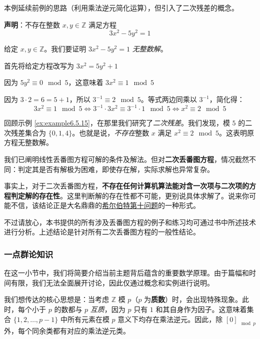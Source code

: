 \begin{example}
    本例延续前例的思路（利用乘法逆元简化运算），但引入了二次残差的概念。

    \textbf{声明}：不存在整数 $x, y \in \mathbb{Z}$ 满足方程
    \[3x^2-5y^2=1\]

    给定 $x, y \in \mathbb{Z}$。我们要证明 $3x^2-5y^2=1$ \emph{无整数解}。

    首先将给定方程改写为 $3x^2 = 5y^2+1$

    因为 $5y^2 \equiv 0 \mod 5$，这意味着 $3x^2 \equiv 1 \mod 5$

    因为 $3 \cdot 2 = 6 = 5 + 1$，所以 $3^{-1} \equiv 2 \mod 5$。等式两边同乘以 $3^{-1}$，简化得：
    \[3x^2 \equiv 1 \mod 5 \iff 3^{-1} \cdot 3x^2 \equiv 3^{-1} \cdot 1 \mod 5 \iff x^2 \equiv 2 \mod 5\]

    回顾示例 \ref{ex:example6.5.15}，在那里我们研究了\emph{二次残差}。我们发现，模 $5$ 的二次残差集合为 $\{0, 1, 4\}$。也就是说，\emph{不存在}整数 $x$ 满足 $x^2 \equiv 2 \mod 5$。这表明原方程无整数解。
\end{example}

\begin{tcolorbox}[colback=gray!10,
    colframe=black,
    width=\textwidth,
    arc=2mm, auto outer arc,
    title={有趣的事实},breakable,enhanced jigsaw,
    before upper={\parindent15pt\noindent},	]
    我们已阐明线性丢番图方程可解的条件及解法。但对\textbf{二次丢番图方程}，情况截然不同：判定其是否有解极为困难，即使存在解，实际求解也异常复杂。

    事实上，对于二次丢番图方程，\textbf{不存在任何计算机算法能对含一次项与二次项的方程判定解的存在性}。这里判断解的存在性都不可能，更别说具体求解了。说来你可能不信，该结论正是大名鼎鼎的\href{https://en.wikipedia.org/wiki/Hilbert's_tenth_problem}{希尔伯特第十问题}的一种形式。

    不过请放心，本书提供的所有涉及丢番图方程的例子和练习均可通过书中所述技术进行分析。上述结论是针对所有二次丢番图方程的一般性结论。
\end{tcolorbox}

\subsubsection*{一点群论知识}

在这一小节中，我们将简要介绍当前主题背后蕴含的重要数学原理。由于篇幅和时间有限，我们无法全面展开讨论，因此仅通过概念和实例进行说明。

我们想传达的核心思想是：当考虑 $\mathbb{Z}$ 模 $p$（$p$ 为\textbf{质数}）时，会出现特殊现象。此时，每个小于 $p$ 的数都与 $p$ \emph{互质}，因为 $p$ 只有 $1$ 和其自身作为因子。这意味着集合 $\{1, 2, \dots, p-1\}$ 中所有元素在模 $p$ 意义下均存在乘法逆元。因此，除 $[0]_{\mod p}$ 外，每个同余类都有对应的乘法逆元类。

